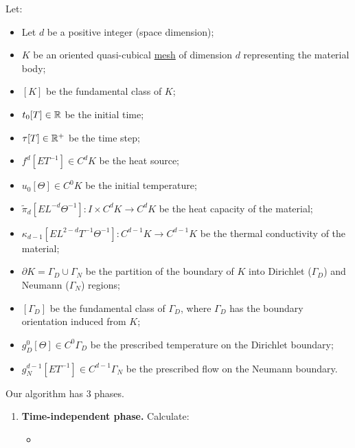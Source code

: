 \begin{algorithm}
  \label{idec/heat_transport/discrete/mixed_weak_transient_solve_trapezoidal-algorithm}
  Let:
  \begin{itemize}
    \item
      Let $d$ be a positive integer (space dimension);
    \item
      $K$ be an oriented quasi-cubical \hyperref[idec:mesh:definition]{mesh} of
      dimension $d$ representing the material body;
    \item
      $[K]$ be the fundamental class of $K$;
    \item
      $t_0 [T] \in \mathbb{R}$ be the initial time;
    \item
      $\tau [T] \in \mathbb{R}^+$ be the time step;
    \item
      $f^d [E T^{-1}] \in C^d K$ be the heat source;
    \item
      $u_0 [\Theta] \in C^0 K$ be the initial temperature;
    \item
      $\tilde{\pi}_d [E L^{-d} \Theta^{-1}] \colon I \times C^d K \to C^d K$
      be the heat capacity of the material;
    \item
      $\kappa_{d - 1} [E L^{2 - d} T^{-1} \Theta^{-1}]
        \colon C^{d - 1} K \to C^{d - 1} K$
      be the thermal conductivity of the material;
    \item
      $\partial K = \Gamma_D \cup \Gamma_N$ be the partition of the boundary of
      $K$ into Dirichlet ($\Gamma_D$) and Neumann ($\Gamma_N$) regions;
    \item
      $[\Gamma_D]$ be the fundamental class of $\Gamma_D$, where $\Gamma_D$
      has the boundary orientation induced from $K$;
    \item
      $g_D^0 [\Theta] \in C^0 \Gamma_D$
      be the prescribed temperature on the Dirichlet boundary;
    \item
      $g_N^{d - 1} [E T^{-1}] \in C^{d - 1} \Gamma_N$
      be the prescribed flow on the Neumann boundary.
  \end{itemize}
  Our algorithm has $3$ phases.
  \begin{enumerate}
    \item
      \textbf{Time-independent phase.}
      Calculate:
      \begin{itemize}
        \item

\end{itemize}
\end{enumerate}
\end{algorithm}
